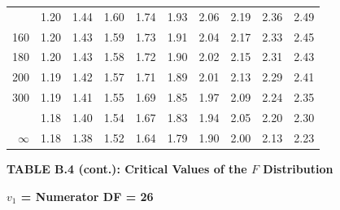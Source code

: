 \documentclass[10pt]{article}
\begin{document}
\begin{longtable}{@{}r!{\vrule width 0.8pt\hspace{0.55em}}rrrrrrrrr@{}}
 & 1.20 & 1.44 & 1.60 & 1.74 & 1.93 & 2.06 & 2.19 & 2.36 & 2.49 \\
160 & 1.20 & 1.43 & 1.59 & 1.73 & 1.91 & 2.04 & 2.17 & 2.33 & 2.45 \\
180 & 1.20 & 1.43 & 1.58 & 1.72 & 1.90 & 2.02 & 2.15 & 2.31 & 2.43 \\
200 & 1.19 & 1.42 & 1.57 & 1.71 & 1.89 & 2.01 & 2.13 & 2.29 & 2.41 \\
300 & 1.19 & 1.41 & 1.55 & 1.69 & 1.85 & 1.97 & 2.09 & 2.24 & 2.35 \\
 & 1.18 & 1.40 & 1.54 & 1.67 & 1.83 & 1.94 & 2.05 & 2.20 & 2.30 \\
$\infty$ & 1.18 & 1.38 & 1.52 & 1.64 & 1.79 & 1.90 & 2.00 & 2.13 & 2.23 \\
\end{longtable}
\newpage
\thispagestyle{empty}
\begin{center}
{\large\bfseries TABLE B.4 (cont.): Critical Values of the $F$ Distribution\par}
\end{center}
{\large\bfseries $v_1$ = Numerator DF = 26\par}
\vspace{0.5em}
\small
\end{document}
